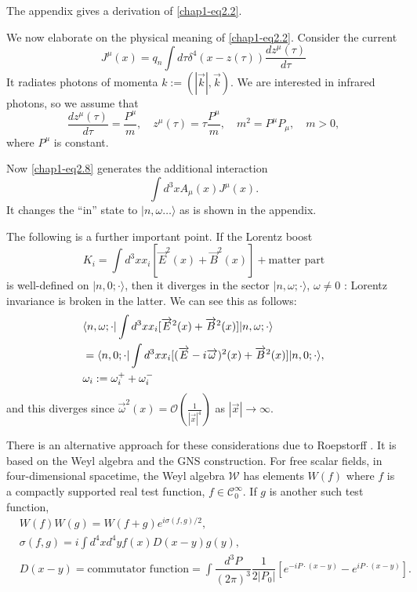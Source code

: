 The appendix gives a derivation of \eqref{chap1-eq2.2}.

We now elaborate on the physical meaning of \eqref{chap1-eq2.2}. Consider the current
\begin{equation}
J^{\mu}(x)=q_{n}\int d\tau \delta^{4}(x-z(\tau))\frac{dz^{\mu}(\tau)}{d\tau}\label{chap1-eq2.8}
\end{equation}
It radiates photons of momenta $k := (| \overrightarrow{k}|, \overrightarrow{k})$. We are interested in infrared photons, so we assume that
\begin{equation}
\frac{dz^{\mu}(\tau)}{d\tau}=\dfrac{P^{\mu}}{m},\quad z^{\mu}(\tau)=\tau\frac{P^{\mu}}{m},\quad m^{2}=P^{\mu}P_{\mu},\quad m>0,\label{chap1-eq2.9}
\end{equation}
where $P^{\mu}$ is constant.

Now \eqref{chap1-eq2.8} generates the additional interaction
\begin{equation}
\int d^{3}xA_{\mu}(x)J^{\mu}(x).\label{chap1-eq2.10}
\end{equation}
It changes the ``in'' state to $|n,\omega\ldots\rangle$ as is shown in the appendix.

The following is a further important point. If the Lorentz boost
\begin{equation}
K_{i}=\int d^{3}xx_{i}[\overrightarrow{E}^{2}(x)+\overrightarrow{B}^{2}(x)]+\text{matter part}\label{chap1-eq2.11}
\end{equation}
is well-defined on $|n, 0;\cdot\rangle$, then it diverges in the sector $|n,\omega;\cdot \rangle$, $\omega\neq 0$ : Lorentz invariance is broken in the latter. We can see this as follows:
\begin{align}
& \langle n,\omega;\cdot | \int d^{3}xx_{i}[\overrightarrow{E}^{2}(x)+\overrightarrow{B}^{2}(x)]|n,\omega;\cdot\rangle\notag\\
& =\langle n,0;\cdot |\int d^{3}xx_{i}[(\overrightarrow{E}-i\overrightarrow{\omega})^{2}(x)+\overrightarrow{B}^{2}(x)]|n,0;\cdot\rangle,\notag\\
&\omega_{i} := \omega^{+}_{i}+\omega^{-}_{i}\label{chap1-eq2.12}
\end{align}
and this diverges since $\overrightarrow{\omega}^{2}(x)=\mathcal{O}(\frac{1}{|\overrightarrow{x}|^{4}})$ as $|\overrightarrow{x}|\to \infty$.

There is an alternative approach for these considerations due to Roepstorff \cite{key6}. It is based on the Weyl algebra and the GNS construction. For free scalar fields, in four-dimensional spacetime, the Weyl algebra $\mathcal{W}$ has elements $W(f)$ where $f$ is a compactly supported real test function, $f\in \mathcal{C}^{\infty}_{0}$. If $g$ is another such test function,
\begin{align}
& W(f)W(g)=W(f+g)e^{i\sigma(f,g)/2},\label{chap1-eq2.13}\\
& \sigma (f,g)=i \int d^{4}xd^{4}yf(x)D(x-y)g(y),\label{chap1-eq2.14}\\
& D(x-y)=\text{commutator function} = \int \dfrac{d^{3}P}{(2\pi)^{3}}\dfrac{1}{2|P_{0}|}[e^{-iP\cdot (x-y)}-e^{iP\cdot (x-y)}].\label{chap1-eq2.15}
\end{align}

